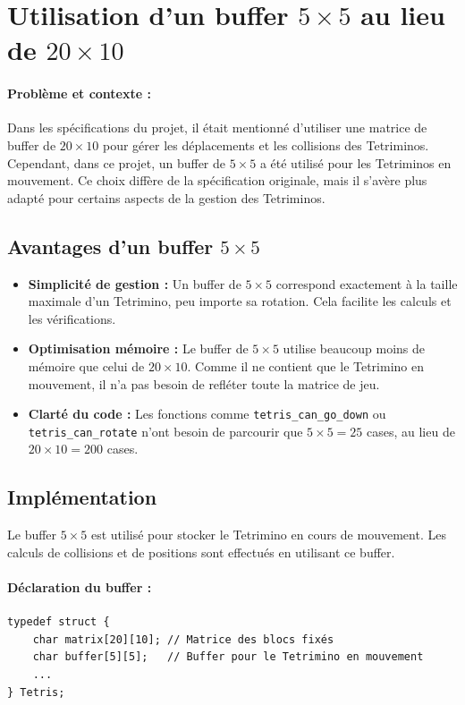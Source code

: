 \documentclass[12pt,a4paper]{report}
\begin{document}
\section{Utilisation d'un buffer \(5 \times 5\) au lieu de \(20 \times 10\)}

\paragraph{Problème et contexte :}
Dans les spécifications du projet, il était mentionné d’utiliser une matrice de buffer de \(20 \times 10\) pour gérer les déplacements et les collisions des Tetriminos. Cependant, dans ce projet, un buffer de \(5 \times 5\) a été utilisé pour les Tetriminos en mouvement. Ce choix diffère de la spécification originale, mais il s'avère plus adapté pour certains aspects de la gestion des Tetriminos.

\subsection{Avantages d’un buffer \(5 \times 5\)}
\begin{itemize}
    \item \textbf{Simplicité de gestion :} Un buffer de \(5 \times 5\) correspond exactement à la taille maximale d’un Tetrimino, peu importe sa rotation. Cela facilite les calculs et les vérifications.
    \item \textbf{Optimisation mémoire :} Le buffer de \(5 \times 5\) utilise beaucoup moins de mémoire que celui de \(20 \times 10\). Comme il ne contient que le Tetrimino en mouvement, il n’a pas besoin de refléter toute la matrice de jeu.
    \item \textbf{Clarté du code :} Les fonctions comme \texttt{tetris\_can\_go\_down} ou \texttt{tetris\_can\_rotate} n’ont besoin de parcourir que \(5 \times 5 = 25\) cases, au lieu de \(20 \times 10 = 200\) cases.
\end{itemize}

\subsection{Implémentation}
Le buffer \(5 \times 5\) est utilisé pour stocker le Tetrimino en cours de mouvement. Les calculs de collisions et de positions sont effectués en utilisant ce buffer.

\paragraph{Déclaration du buffer :}
\begin{lstlisting}
typedef struct {
    char matrix[20][10]; // Matrice des blocs fixés
    char buffer[5][5];   // Buffer pour le Tetrimino en mouvement
    ...
} Tetris;
\end{lstlisting}
\newpage
\end{document}
